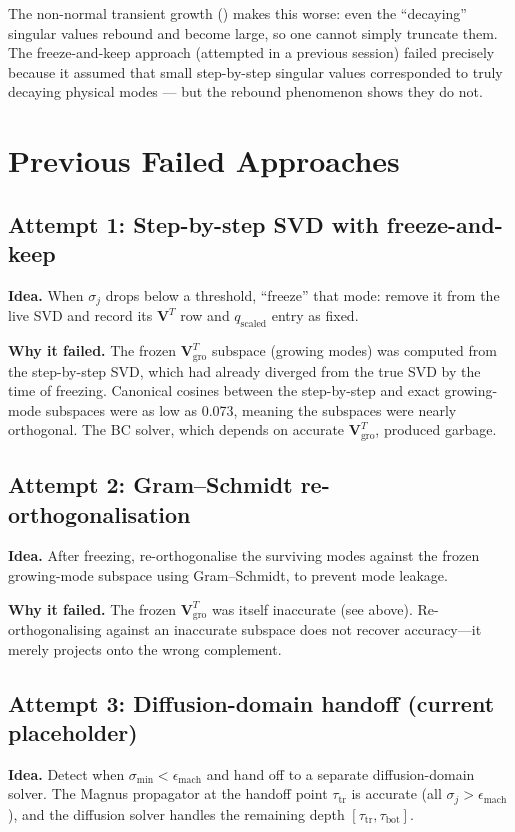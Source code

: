 \documentclass[11pt,a4paper]{article}
\newcommand{\mat}[1]{\mathbf{#1}}
\newcommand{\tbot}{\tau_{\mathrm{bot}}}
\newcommand{\ttrans}{\tau_{\mathrm{tr}}}
\theoremstyle{definition}
\begin{document}
The non-normal transient growth () makes this worse:
even the ``decaying'' singular values rebound and become large, so one
cannot simply truncate them.  The freeze-and-keep approach (attempted in
a previous session) failed precisely because it assumed that small step-by-step
singular values corresponded to truly decaying physical modes --- but
the rebound phenomenon shows they do not.


\section{Previous Failed Approaches}\label{sec:failures}

\subsection{Attempt 1: Step-by-step SVD with freeze-and-keep}
\textbf{Idea.}  When $\sigma_j$ drops below a threshold, ``freeze'' that
mode: remove it from the live SVD and record its $\mat{V}^T$ row and
$q_{\text{scaled}}$ entry as fixed.

\textbf{Why it failed.}  The frozen $\mat{V}^T_{\text{gro}}$ subspace
(growing modes) was computed from the step-by-step SVD, which had already
diverged from the true SVD by the time of freezing.  Canonical cosines
between the step-by-step and exact growing-mode subspaces were as low as
0.073, meaning the subspaces were nearly orthogonal.  The BC solver,
which depends on accurate $\mat{V}^T_{\text{gro}}$, produced garbage.

\subsection{Attempt 2: Gram--Schmidt re-orthogonalisation}
\textbf{Idea.}  After freezing, re-orthogonalise the surviving modes
against the frozen growing-mode subspace using Gram--Schmidt, to prevent
mode leakage.

\textbf{Why it failed.}  The frozen $\mat{V}^T_{\text{gro}}$ was itself
inaccurate (see above).  Re-orthogonalising against an inaccurate subspace
does not recover accuracy---it merely projects onto the wrong complement.

\subsection{Attempt 3: Diffusion-domain handoff (current placeholder)}
\textbf{Idea.}  Detect when $\sigma_{\min}<\epsilon_{\text{mach}}$ and hand
off to a separate diffusion-domain solver.  The Magnus propagator at the
handoff point $\ttrans$ is accurate (all $\sigma_j>\epsilon_{\text{mach}}$),
and the diffusion solver handles the remaining depth $[\ttrans,\tbot]$.
\end{document}
